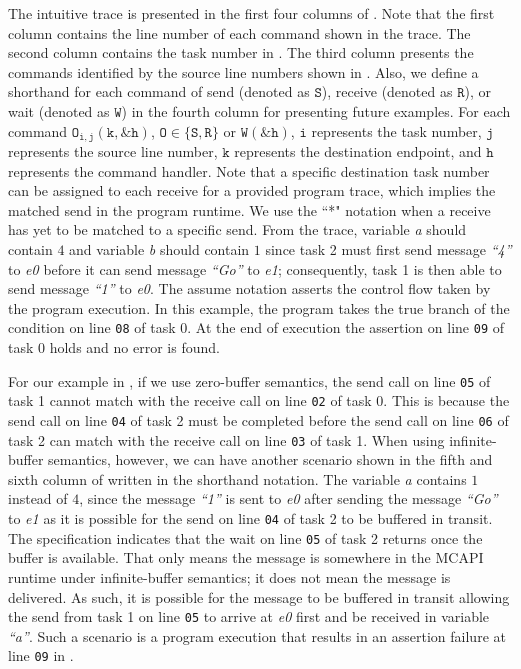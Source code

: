 The intuitive trace is presented in the first four columns of . Note that the first column contains the line number of each command shown in the trace. The second column contains the task number in . The third column presents the commands identified by the source line numbers shown in . Also, we define a shorthand for each command of send (denoted as $\mathtt{S}$), receive (denoted as $\mathtt{R}$), or wait (denoted as $\mathtt{W}$) in the fourth column for presenting future examples. For each command $\mathtt{O_{i,j}(k,\&h)}$, $\mathtt{O \in \{S,R\}}$ or $\mathtt{W(\&h)}$, $\mathtt{i}$ represents the task number, $\mathtt{j}$ represents the source line number, $\mathtt{k}$ represents the destination endpoint, and $\mathtt{h}$ represents the command handler. Note that a specific destination task number can be assigned to each receive for a provided program trace, which implies the matched send in the program runtime. We use the ``*" notation when a receive has yet to be matched to a specific send. From the trace, variable \textit{a} should contain $4$ and variable
\textit{b} should contain $1$ since task 2 must first send message \textit{``4''}
to \textit{e0} before it can send message \textit{``Go''} to \textit{e1};
consequently, task 1 is then able to send message \textit{``1''} to
\textit{e0}. The assume notation asserts the control flow taken by the program execution. In this example, the program takes the true branch of the condition on line \texttt{08} of task 0.  At the end of execution the assertion on line \texttt{09}
of task 0 holds and no error is found.

For our example in , if we use zero-buffer semantics, the send call on line \texttt{05} of task 1 cannot match with the receive call on line \texttt{02} of task 0. This is because the send call on line \texttt{04} of task 2 must be completed before the send call on line \texttt{06} of task 2 can match with the receive call on line \texttt{03} of task 1. When using infinite-buffer semantics, however, we can have another scenario shown in the fifth and sixth column of  written in the shorthand notation. The variable \textit{a} contains $1$ instead of $4$, since the message \textit{``1''} is sent to \textit{e0} after sending the message \textit{``Go''} to \textit{e1} as it is possible for the send on line \texttt{04} of task 2 to be buffered in transit. The specification indicates that the wait on line \texttt{05} of task 2 returns once the buffer is available. That only means the message is somewhere in the MCAPI runtime under infinite-buffer semantics; it does not mean the message is delivered. As such, it is possible for the message to be buffered in transit allowing the send from task 1 on line \texttt{05} to arrive at \textit{e0} first and be received in variable \textit{``a''}. Such a scenario is a program execution that results in an assertion failure at line \texttt{09} in .

